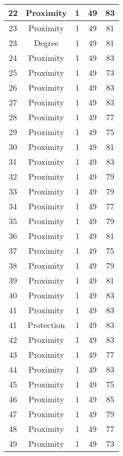 \documentclass[results.tex]{subfiles}
\begin{document}
\begin{center}
\begin{tabular}{| c || c | c | c | c |}
    \hline
    22 & Proximity & 1 & 49 & 83 \\ 
    \hline
    23 & Proximity & 1 & 49 & 81 \\ 
    \hline
    23 & Degree & 1 & 49 & 81 \\ 
    \hline
    24 & Proximity & 1 & 49 & 83 \\ 
    \hline
    25 & Proximity & 1 & 49 & 73 \\ 
    \hline
    26 & Proximity & 1 & 49 & 83 \\ 
    \hline
    27 & Proximity & 1 & 49 & 83 \\ 
    \hline
    28 & Proximity & 1 & 49 & 77 \\ 
    \hline
    29 & Proximity & 1 & 49 & 75 \\ 
    \hline
    30 & Proximity & 1 & 49 & 81 \\ 
    \hline
    31 & Proximity & 1 & 49 & 83 \\ 
    \hline
    32 & Proximity & 1 & 49 & 79 \\ 
    \hline
    33 & Proximity & 1 & 49 & 79 \\ 
    \hline
    34 & Proximity & 1 & 49 & 77 \\ 
    \hline
    35 & Proximity & 1 & 49 & 79 \\ 
    \hline
    36 & Proximity & 1 & 49 & 81 \\ 
    \hline
    37 & Proximity & 1 & 49 & 75 \\ 
    \hline
    38 & Proximity & 1 & 49 & 79 \\ 
    \hline
    39 & Proximity & 1 & 49 & 81 \\ 
    \hline
    40 & Proximity & 1 & 49 & 83 \\ 
    \hline
    41 & Proximity & 1 & 49 & 83 \\ 
    \hline
    41 & Protection & 1 & 49 & 83 \\ 
    \hline
    42 & Proximity & 1 & 49 & 83 \\ 
    \hline
    43 & Proximity & 1 & 49 & 77 \\ 
    \hline
    44 & Proximity & 1 & 49 & 83 \\ 
    \hline
    45 & Proximity & 1 & 49 & 75 \\ 
    \hline
    46 & Proximity & 1 & 49 & 85 \\ 
    \hline
    47 & Proximity & 1 & 49 & 79 \\ 
    \hline
    48 & Proximity & 1 & 49 & 77 \\ 
    \hline
    49 & Proximity & 1 & 49 & 73 \\ 
    \hline   \end{tabular}
\end{center}
\end{document}
